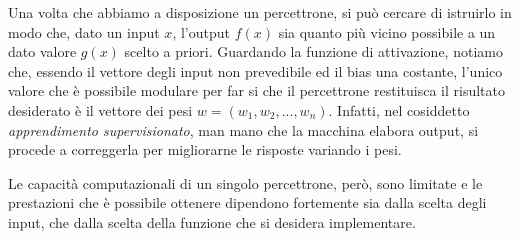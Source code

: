 Una volta che abbiamo a disposizione un percettrone, si può cercare di istruirlo in modo che, dato un input \(x\), l'output \(f(x)\) sia quanto più vicino possibile a un dato valore \(g(x)\) scelto a priori.
Guardando la funzione di attivazione, notiamo che, essendo il vettore degli input non prevedibile ed il bias una costante, l'unico valore che è possibile modulare per far si che il percettrone restituisca il risultato desiderato è il vettore dei pesi \(w=(w_1,w_2,...,w_n)\). Infatti, nel cosiddetto \textit{apprendimento supervisionato}, man mano che la macchina elabora output, si procede a correggerla per migliorarne le risposte variando i pesi.

Le capacità computazionali di un singolo percettrone, però, sono limitate e le prestazioni che è possibile ottenere dipendono fortemente sia dalla scelta degli input, che dalla scelta della funzione che si desidera implementare.
